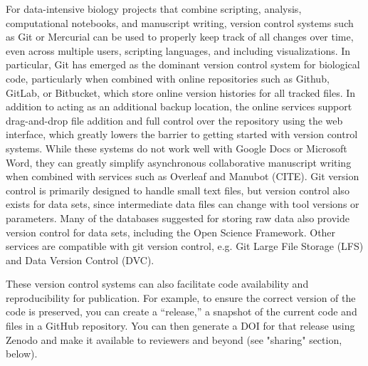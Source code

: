 \documentclass[10pt,letterpaper]{article}
\begin{document}
For data-intensive biology projects that combine scripting, analysis, computational notebooks, and manuscript writing, version control systems such as Git or Mercurial can be used to properly keep track of all changes over time, even across multiple users, scripting languages, and including visualizations. 
In particular, Git has emerged as the dominant version control system for biological code, particularly when combined with online repositories such as Github, GitLab, or Bitbucket, which store online version histories for all tracked files.
In addition to acting as an additional backup location, the online services support drag-and-drop file addition and full control over the repository using the web interface, which greatly lowers the barrier to getting started with version control systems. 
While these systems do not work well with Google Docs or Microsoft Word, they can greatly simplify asynchronous collaborative manuscript writing when combined with services such as Overleaf and Manubot (CITE). 
Git version control is primarily designed to handle small text files, but version control also exists for data sets, since intermediate data files can change with tool versions or parameters. 
Many of the databases suggested for storing raw data also provide version control for data sets, including the Open Science Framework. 
Other services are compatible with git version control, e.g. Git Large File Storage (LFS) and Data Version Control (DVC).

These version control systems can also facilitate code availability and reproducibility for publication. 
For example, to ensure the correct version of the code is preserved, you can create a “release,” a snapshot of the current code and files in a GitHub repository. 
You can then generate a DOI for that release using Zenodo and make it available to reviewers and beyond (see "sharing" section, below).


\end{document}
